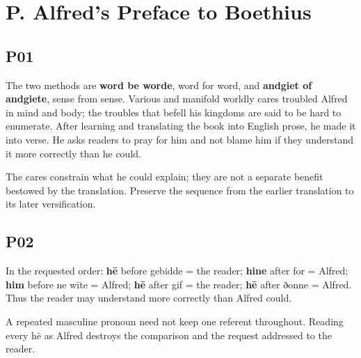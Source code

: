 \section*{P. Alfred’s Preface to Boethius}

\subsection*{P01}

\par\begin{minipage}{\linewidth}\raggedright
The two methods are \textbf{word be worde}, word for word, and \textbf{andgiet of andgiete}, sense from sense. Various and manifold worldly cares troubled Alfred in mind and body; the troubles that befell his kingdoms are said to be hard to enumerate. After learning and translating the book into English prose, he made it into verse. He asks readers to pray for him and not blame him if they understand it more correctly than he could.

The cares constrain what he could explain; they are not a separate benefit bestowed by the translation. Preserve the sequence from the earlier translation to its later versification.

\end{minipage}\par\addvspace{4pt}

\subsection*{P02}

\par\begin{minipage}{\linewidth}\raggedright
In the requested order: \textbf{hē} before gebidde = the reader; \textbf{hine} after for = Alfred; \textbf{him} before ne wīte = Alfred; \textbf{hē} after gif = the reader; \textbf{hē} after ðonne = Alfred. Thus the reader may understand more correctly than Alfred could.

A repeated masculine pronoun need not keep one referent throughout. Reading every hē as Alfred destroys the comparison and the request addressed to the reader.

\end{minipage}\par\addvspace{4pt}

